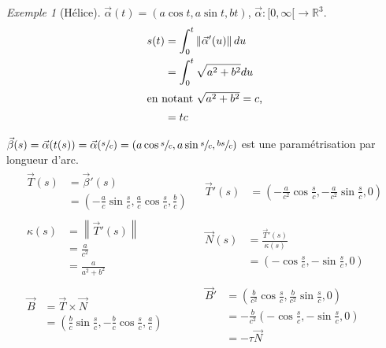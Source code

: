 \documentclass{report}
\theoremstyle{definition}
\theoremstyle{remark}
\newtheorem*{exem}{Exemple}
\def\RR{\mathbb{R}}
\newcommand*{\norme}[1]{\left\|#1\right\|}
\begin{document}
	\begin{exem}[H\'elice]
		$\vec\alpha(t) = (a\cos t, a\sin t ,bt)$, $\vec\alpha:[0,\infty[\to\RR^3$.
		\begin{align*}
			s(t)&= \int_{0}^{t} \norme{\vec\alpha'(u)} du\\
			&= \int_{0}^{t} \sqrt{a^2+b^2} du\\
			\shortintertext{en notant $\sqrt{a^2+b^2}=c$,}
			&= tc
		\end{align*}

		$\vec\beta(s) = \vec\alpha(t(s)) = \vec\alpha(\sfrac{s}{c}) = (a\cos\sfrac{s}{c}, a\sin\sfrac{s}{c}, \sfrac{bs}{c})$ est une param\'etrisation par longueur d'arc.
		\begin{align*}
			\begin{split}
				\vec T(s)&= \vec\beta'(s)\\
				&= \left( -\frac{a}{c}\sin\frac{s}{c}, \frac{a}{c}\cos\frac{s}{c}, \frac{b}{c} \right)
			\end{split}
			&
			\begin{split}
				\vec T'(s)&= \left( -\frac{a}{c^2}\cos\frac{s}{c}, -\frac{a}{c^2}\sin\frac{s}{c}, 0 \right)
			\end{split}
			\\[1em]
			\begin{split}
				\kappa(s)&= \norme{\vec T'(s)}\\
				&= \frac{a}{c^2}\\
				&= \frac{a}{a^2+b^2}
			\end{split}
			&
			\begin{split}
				\vec N(s)&= \frac{\vec T'(s)}{\kappa(s)}\\
				&= \left( -\cos\frac{s}{c}, -\sin\frac{s}{c}, 0 \right)
			\end{split}
			\\[1em]
			\begin{split}
				\vec B&= \vec T \times \vec N\\
				&= \left( \frac{b}{c}\sin\frac{s}{c}, -\frac{b}{c}\cos\frac{s}{c}, \frac{a}{c} \right)
			\end{split}
			&
			\begin{split}
				\vec B'&= \left( \frac{b}{c^2}\cos\frac{s}{c}, \frac{b}{c^2}\sin\frac{s}{c}, 0 \right)\\
				&= -\frac{b}{c^2} \left( -\cos\frac{s}{c}, -\sin\frac{s}{c}, 0 \right)\\
				&= -\tau\vec N
			\end{split}
			\\[1em]
			\begin{split}

\end{split}
\end{align*}
\end{exem}
\end{document}
